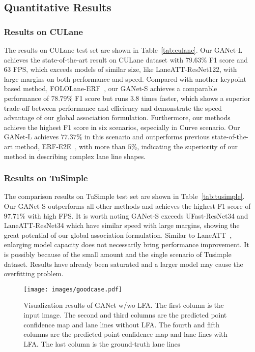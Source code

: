 \documentclass[10pt,twocolumn,letterpaper]{article}
\begin{document}
\subsection{Quantitative Results}

\subsubsection{Results on CULane}
The results on CULane test set are shown in Table~\ref{tab:culane}. Our GANet-L achieves the state-of-the-art result on CULane dataset with $79.63\%$ F1 score and $63$ FPS, which exceeds models of similar size, like LaneATT-ResNet122, with large margins on both performance and speed.
Compared with another keypoint-based method, FOLOLane-ERF~\cite{Qu_2021_CVPR}, our GANet-S achieves a comparable performance of $78.79\%$ F1 score but runs $3.8$ times faster, which shows a superior trade-off between performance and efficiency and demonstrate the speed advantage of our global association formulation.
Furthermore, our methods achieve the highest F1 score in six scenarios, especially in Curve scenario.
Our GANet-L achieves $77.37\%$ in this scenario and outperforms previous state-of-the-art method, ERF-E2E~\cite{yoo2020end}, with more than $5\%$, indicating the superiority of our method in describing complex lane line shapes.

\subsubsection{Results on TuSimple}

The comparison results on TuSimple test set are shown in Table~\ref{tab:tusimple}. Our GANet-S outperforms all other methods and achieves the highest F1 score of $97.71\%$ with high FPS. 
It is worth noting GANet-S exceeds UFast-ResNet34 and LaneATT-ResNet34 which have similar speed with large margins, showing the great potential of our global association formulation.
Similar to LaneATT~\cite{Tabelini_2021_CVPR}, enlarging model capacity does not necessarily bring performance improvement. It is possibly because of the small amount and the single scenario of Tusimple dataset. Results have already been saturated and a larger model may cause the overfitting problem. 

\begin{figure*}[!t]
    \centering
    \texttt{[image: images/goodcase.pdf]}
    \caption{Visualization results of GANet w/wo LFA. The first column is the input image. The second and third columns are the predicted point confidence map and lane lines without LFA. The fourth and fifth columns are the predicted point confidence map and lane lines with LFA. The last column is the ground-truth lane lines}
    \label{fig:LFAmodule}
\end{figure*}
\end{document}
